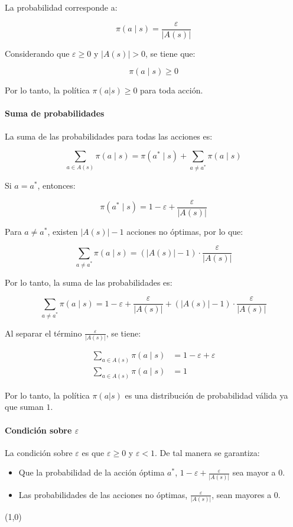 La probabilidad corresponde a:

\[
    \pi \left(a \mid s\right) = \frac{\varepsilon}{|A(s)|}
\]

Considerando que $\varepsilon \geq 0$ y $|A(s)| > 0$, se tiene que:

\[
    \pi \left(a \mid s\right) \geq 0
\]

Por lo tanto, la política $\pi(a|s) \geq 0$ para toda acción.

\paragraph{Suma de probabilidades}

La suma de las probabilidades para todas las acciones es:

\[
    \sum_{a \in A(s)} \pi \left(a \mid s\right) = \pi \left( a^{\ast} \mid s \right)  + \sum_{a \neq a^{\ast}} \pi \left(a \mid s\right)
\]

Si $a = a^{\ast}$, entonces:

\[
    \pi \left(a^{\ast} \mid s\right) = 1 - \varepsilon + \frac{\varepsilon}{|A(s)|}
\]

Para $a \neq a^{\ast}$, existen $|A(s)| - 1$ acciones no óptimas, por lo que:


\[
    \sum_{a \neq a^{\ast}} \pi \left(a \mid s\right) = \left(|A(s)| - 1\right) \cdot \frac{\varepsilon}{|A(s)|}
\]

Por lo tanto, la suma de las probabilidades es:

\[
    \sum_{a \neq a^{\ast}} \pi \left(a \mid s\right) = 1 - \varepsilon + \frac{\varepsilon}{|A(s)|} + \left(|A(s)| - 1\right) \cdot \frac{\varepsilon}{|A(s)|}
\]

Al separar el término $\frac{\varepsilon}{|A(s)|}$, se tiene:

\begin{align*}
    \sum_{a \in A(s)} \pi \left(a \mid s\right) &= 1 - \varepsilon + \varepsilon \\
    \sum_{a \in A(s)} \pi \left(a \mid s\right) &= 1
\end{align*}

Por lo tanto, la política $\pi(a|s)$ es una distribución de probabilidad válida ya que suman $1$.

\paragraph{Condición sobre $\varepsilon$}

La condición sobre $\varepsilon$ es que $\varepsilon \geq 0$ y $\varepsilon < 1$.
De tal manera se garantiza:

\begin{itemize}
    \item Que la probabilidad de la acción óptima $a^{\ast}$, $1 - \varepsilon + \frac{\varepsilon}{|A(s)|}$ sea mayor a $0$.
    \item Las probabilidades de las acciones no óptimas, $\frac{\varepsilon}{|A(s)|}$, sean mayores a $0$.
\end{itemize}

\line(1,0){\textwidth}
